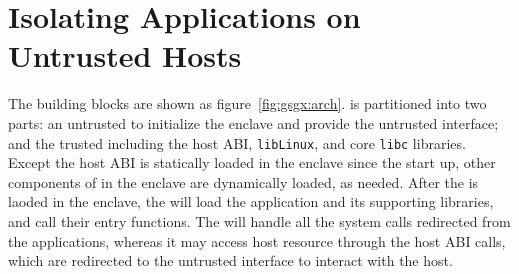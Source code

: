 \section{Isolating Applications on Untrusted Hosts}
\label{sec:graphene:sgx}





The building blocks are shown as figure~\ref{fig:gsgx:arch}.
\graphenesgx{} is partitioned into two parts:
an untrusted \pal{} to initialize the enclave and provide the untrusted interface;
and the trusted \libos{} including the host ABI, {\tt libLinux}, and core {\tt libc} libraries.
Except the host ABI is statically loaded in the enclave since the start up,
other components of \graphenesgx{} in the enclave are dynamically loaded,
as needed. 
After the \libos{} is laoded in the enclave,
the \libos{} will load the application and its supporting libraries,
and call their entry functions.
The \libos{} will handle all the system calls redirected from the applications,
whereas it may access host resource through the host ABI calls,
which are redirected to the untrusted interface
to interact with the host. 

